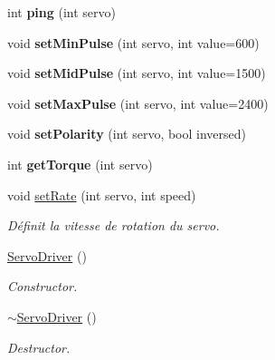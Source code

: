 \begin{DoxyCompactItemize}
\mbox{\label{classServoDriver_a952fbbfdbf9d0b57d5c6d6c09019b366}} 
int {\bfseries ping} (int servo)
\item 
\mbox{\label{classServoDriver_a40ec259cb0ced3154b1e73cc52d48938}} 
void {\bfseries set\+Min\+Pulse} (int servo, int value=600)
\item 
\mbox{\label{classServoDriver_a92d53f7f50a7eb95e14ae358ad0b7d23}} 
void {\bfseries set\+Mid\+Pulse} (int servo, int value=1500)
\item 
\mbox{\label{classServoDriver_aaaeaab97cef5c2ebcd05c265fdff747f}} 
void {\bfseries set\+Max\+Pulse} (int servo, int value=2400)
\item 
\mbox{\label{classServoDriver_a89b2add38109f20260369e0a0d747bf2}} 
void {\bfseries set\+Polarity} (int servo, bool inversed)
\item 
\mbox{\label{classServoDriver_a108cce4f0dcf60bf443ee932621bc89c}} 
int {\bfseries get\+Torque} (int servo)
\item 
\mbox{\label{classServoDriver_a5a10cd45849dea884d98046a5e8180ab}} 
void \hyperlink{classServoDriver_a5a10cd45849dea884d98046a5e8180ab}{set\+Rate} (int servo, int speed)
\begin{DoxyCompactList}\small\item\em Définit la vitesse de rotation du servo. \end{DoxyCompactList}\item 
\mbox{\label{classServoDriver_a2076bae148e26ee3f854f1f1984d9714}} 
\hyperlink{classServoDriver_a2076bae148e26ee3f854f1f1984d9714}{Servo\+Driver} ()
\begin{DoxyCompactList}\small\item\em Constructor. \end{DoxyCompactList}\item 
\mbox{\label{classServoDriver_acf6cad7d5b891fbe4ff44eaec8409db7}} 
\hyperlink{classServoDriver_acf6cad7d5b891fbe4ff44eaec8409db7}{$\sim$\+Servo\+Driver} ()
\begin{DoxyCompactList}\small\item\em Destructor. \end{DoxyCompactList}\item 

\end{DoxyCompactItemize}
